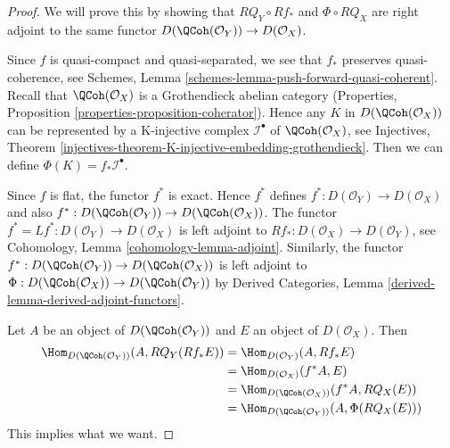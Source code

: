 \begin{proof}
We will prove this by showing that $RQ_Y \circ Rf_*$ and $\Phi \circ RQ_X$
are right adjoint to the same functor
$D(\QCoh(\mathcal{O}_Y)) \to D(\mathcal{O}_X)$.

\medskip\noindent
Since $f$ is quasi-compact and quasi-separated, we see that
$f_*$ preserves quasi-coherence, see
Schemes, Lemma \ref{schemes-lemma-push-forward-quasi-coherent}.
Recall that $\QCoh(\mathcal{O}_X)$ is a Grothendieck abelian category
(Properties, Proposition \ref{properties-proposition-coherator}).
Hence any $K$ in $D(\QCoh(\mathcal{O}_X))$
can be represented by a K-injective complex $\mathcal{I}^\bullet$
of $\QCoh(\mathcal{O}_X)$, see
Injectives, Theorem
\ref{injectives-theorem-K-injective-embedding-grothendieck}.
Then we can define $\Phi(K) = f_*\mathcal{I}^\bullet$.

\medskip\noindent
Since $f$ is flat, the functor $f^*$ is exact. Hence $f^*$ defines
$f^* : D(\mathcal{O}_Y) \to D(\mathcal{O}_X)$ and also
$f^* : D(\QCoh(\mathcal{O}_Y)) \to D(\QCoh(\mathcal{O}_X))$.
The functor $f^* = Lf^* : D(\mathcal{O}_Y) \to D(\mathcal{O}_X)$
is left adjoint to
$Rf_* : D(\mathcal{O}_X) \to D(\mathcal{O}_Y)$,
see Cohomology, Lemma \ref{cohomology-lemma-adjoint}.
Similarly, the functor
$f^* : D(\QCoh(\mathcal{O}_Y)) \to D(\QCoh(\mathcal{O}_X))$
is left adjoint to
$\Phi : D(\QCoh(\mathcal{O}_X)) \to D(\QCoh(\mathcal{O}_Y))$
by Derived Categories, Lemma \ref{derived-lemma-derived-adjoint-functors}.

\medskip\noindent
Let $A$ be an object of $D(\QCoh(\mathcal{O}_Y))$ and
$E$ an object of $D(\mathcal{O}_X)$. Then
\begin{align*}
\Hom_{D(\QCoh(\mathcal{O}_Y))}(A, RQ_Y(Rf_*E))
& =
\Hom_{D(\mathcal{O}_Y)}(A, Rf_*E) \\
& =
\Hom_{D(\mathcal{O}_X)}(f^*A, E) \\
& =
\Hom_{D(\QCoh(\mathcal{O}_X))}(f^*A, RQ_X(E)) \\
& =
\Hom_{D(\QCoh(\mathcal{O}_Y))}(A, \Phi(RQ_X(E)))
\end{align*}
This implies what we want.
\end{proof}


